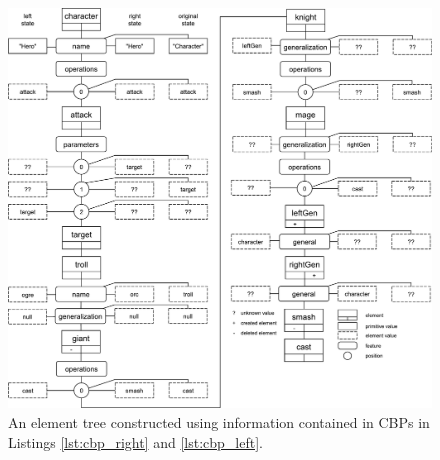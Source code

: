 \begin{figure}
    \centering
    \includegraphics[width=\linewidth]{element_tree_game}
    \caption{An element tree constructed using information contained in CBPs in Listings \ref{lst:cbp_right} and \ref{lst:cbp_left}.}
    \label{fig:element_tree_game}
\end{figure} 

